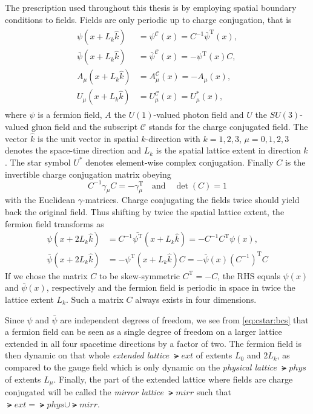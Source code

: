 The prescription used throughout this thesis is  by employing spatial \Cstar boundary conditions to fields.
Fields are only periodic up to charge conjugation, that is
\begin{align} \label{eq:cstar:bcs}
  \begin{split}
    \psi(x + L_k \hat{k})       &= \psi^{\mathcal{C}}(x)       = C^{-1}\bar{\psi}^{\text{T}}(x), \\
    \bar{\psi}(x + L_k \hat{k}) &= \bar{\psi}^{\mathcal{C}}(x) = -\psi^{\text{T}}(x)C, \\
    A_{\mu}(x + L_k \hat{k})    &= A_{\mu}^{\mathcal{C}}(x)    = - A_{\mu}(x), \\
    U_{\mu}(x + L_k \hat{k})    &= U_{\mu}^{\mathcal{C}}(x)    = U_{\mu}^{*}(x),
  \end{split}
\end{align}
where $\psi$ is a fermion field, $A$ the $U(1)$-valued photon field and $U$ the $SU(3)$-valued gluon field and the subscript $\mathcal{C}$ stands for the charge conjugated field. The vector $\hat{k}$ is the unit vector in spatial $k$-direction with $k=1,2,3$, $\mu=0,1,2,3$ denotes the space-time direction and $L_k$ is the spatial lattice extent in direction $k$. The star symbol $U^{*}$ denotes element-wise complex conjugation. Finally $C$ is the invertible charge conjugation matrix obeying
\begin{equation}
  C^{-1} \gamma_{\mu} C = - \gamma_{\mu}^{\text{T}}
  \quad
  \text{and}
  \quad
  \det(C) = 1
\end{equation}
with the Euclidean $\gamma$-matrices.
Charge conjugating the fields twice should yield back the original field.
Thus shifting by twice the spatial lattice extent, the fermion field transforms as
\begin{align}
  \psi(x + 2 L_k \hat{k}) &= C^{-1}\bar{\psi^{\text{T}}}(x + L_k \hat{k}) = - C^{-1} C^{\text{T}} \psi(x), \\
  \bar{\psi}(x + 2 L_k \hat{k}) &= -\psi^{\text{T}}(x + L_k \hat{k})C = - \bar{\psi}(x) (C^{-1})^{\text{T}} C
\end{align}
If we chose the matrix $C$ to be skew-symmetric $C^{\text{T}} = -C$, the RHS equals $\psi(x)$ and $\bar{\psi}(x)$, respectively and the fermion field is periodic in space in twice the lattice extent $L_k$. Such a matrix $C$ always exists in four dimensions.

Since $\psi$ and $\bar{\psi}$ are independent degrees of freedom, we see from \cref{eq:cstar:bcs} that a fermion field can be seen as a single degree of freedom on a larger lattice extended in all four spacetime directions by a factor of two.
The fermion field is then dynamic on that whole \emph{extended lattice} $\lat{ext}$ of extents $L_0$ and $2 L_{k}$, as compared to the gauge field which is only dynamic on the \emph{physical lattice} $\lat{phys}$ of extents $L_{\mu}$.
Finally, the part of the extended lattice where fields are charge conjugated will be called the \emph{mirror lattice} $\lat{mirr}$ such that $\lat{ext} = \lat{phys} \cup \lat{mirr}$.


